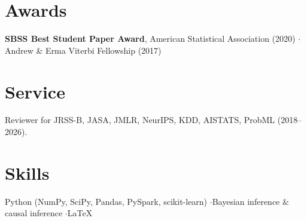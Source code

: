\documentclass[10pt, a4paper]{article}
\begin{document}
\section{Awards}

\textbf{SBSS Best Student Paper Award}, American Statistical Association (2020) \quad$\cdot$\quad Andrew \& Erma Viterbi Fellowship (2017)

\section{Service}

Reviewer for JRSS-B, JASA, JMLR, NeurIPS, KDD, AISTATS, ProbML (2018--2026).

\section{Skills}

Python (NumPy, SciPy, Pandas, PySpark, scikit-learn) \quad$\cdot$\quad Bayesian inference \& causal inference \quad$\cdot$\quad \LaTeX
\end{document}
